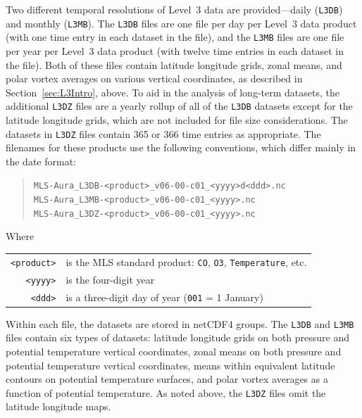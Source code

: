Two different temporal resolutions of Level~3 data are provided---daily (\texttt{L3DB}) and monthly (\texttt{L3MB}). The \texttt{L3DB} files are one file per day per Level~3 data product (with one time entry in each dataset in the file), and the \texttt{L3MB} files are one file per year per Level~3 data product (with twelve time entries in each dataset in the file). Both of these files contain latitude\,\texttimes\,longitude grids, zonal means, and polar vortex averages on various vertical coordinates, as described in Section~\ref{sec:L3Intro}, above. To aid in the analysis of long-term datasets, the additional \texttt{L3DZ} files are a yearly rollup of all of the \texttt{L3DB} datasets except for the latitude\,\texttimes\,longitude grids, which are not included for file size considerations. The datasets in \texttt{L3DZ} files contain 365 or 366 time entries as appropriate. The filenames for these products use the following conventions, which differ mainly in the date format: \newcommand{\fileexample}[2][]{{\texttt{#2}} #1}
\begin{quote}\small
  \fileexample{MLS-Aura\_L3DB-<product>\_v06-00-c01\_<yyyy>d<ddd>.nc}\\
  \fileexample{MLS-Aura\_L3MB-<product>\_v06-00-c01\_<yyyy>.nc}\\
  \fileexample{MLS-Aura\_L3DZ-<product>\_v06-00-c01\_<yyyy>.nc}\\
\end{quote}
Where\\
\begin{tabular}{r@{\ }l}
  \texttt{<product>} & is the MLS standard product: \texttt{CO},
  \texttt{O3}, \texttt{Temperature}, etc.\\
  \texttt{<yyyy>} & is the four-digit year\\
  \texttt{<ddd>} & is a three-digit day of year (\texttt{001} = 1
  January) \\
\end{tabular}

Within each file, the datasets are stored in netCDF4 groups. The \texttt{L3DB} and \texttt{L3MB} files contain six types of datasets: latitude\,\texttimes\,longitude grids on both pressure and potential temperature vertical coordinates, zonal means on both pressure and potential temperature vertical coordinates, means within equivalent latitude contours on potential temperature surfaces, and polar vortex averages as a function of potential temperature. As noted above, the \texttt{L3DZ} files omit the latitude\,\texttimes\,longitude maps.

